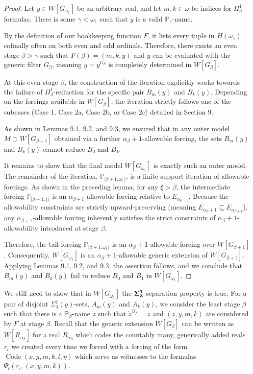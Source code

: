 \documentclass[a4paper,11pt]{article}
\newcommand{\forceP}{\mathbb{P}}
\begin{document}
\begin{proof}
Let $y \in W[G_{\omega_1}]$ be an arbitrary real, and let $m, k \in \omega$ be indices for $\Pi_3^1$ formulas. There is some $\gamma < \omega_1$ such that $\dot{y}$ is a valid $\mathbb{P}_\gamma$-name.

By the definition of our bookkeeping function $F$, it lists every tuple in $H(\omega_1)$ cofinally often on both even and odd ordinals. Therefore, there exists an even stage $\beta > \gamma$ such that $F(\beta) = (m, k, \dot{y})$ and  $\dot{y}$ can be evaluated with the generic filter $G_\beta$, meaning $y = \dot{y}^{G_\beta}$ is completely determined in $W[G_\beta]$.

At this even stage $\beta$, the construction of the iteration explicitly works towards the failure of $\Pi_3^1$-reduction for the specific pair $B_m(y)$ and $B_k(y)$. Depending on the forcings available in $W[G_\beta]$, the iteration strictly follows one of the subcases (Case 1, Case 2a, Case 2b, or Case 2c) detailed in Section 9. 


As shown in Lemmas 9.1, 9.2, and 9.3, we ensured that in any outer model $M \supset W[G_{\beta+1}]$ obtained via a further $\alpha_\beta+1$-allowable forcing, the sets $B_m(y)$ and $B_k(y)$ cannot reduce $B_0$ and $B_1$.

It remains to show that the final model $W[G_{\omega_1}]$ is exactly such an outer model. The remainder of the iteration, $\mathbb{P}_{[\beta+1, \omega_1)}$, is a finite support iteration of allowable forcings. As shown in the preceding lemma, for any $\xi > \beta$, the intermediate forcing $\mathbb{P}_{[\beta+1, \xi)}$ is an $\alpha_{\beta+1}$-allowable forcing relative to $E_{\alpha_{\beta+1}}$. Because the allowability constraints are strictly upward-preserving (meaning $E_{\alpha_\beta+1} \subseteq E_{\alpha_{\beta+1}}$), any $\alpha_{\beta+1}$-allowable forcing inherently satisfies the strict constraints of $\alpha_\beta+1$-allowability introduced at stage $\beta$. 

Therefore, the tail forcing $\mathbb{P}_{[\beta+1, \omega_1)}$ is an $\alpha_\beta+1$-allowable forcing over $W[G_{\beta+1}]$. Consequently, $W[G_{\omega_1}]$ is an $\alpha_\beta+1$-allowable generic extension of $W[G_{\beta+1}]$. Applying Lemmas 9.1, 9.2, and 9.3, the assertion follows, and we conclude that $B_m(y)$ and $B_k(y)$ fail to reduce $B_0$ and $B_1$ in $W[G_{\omega_1}]$.
\end{proof}


We still need to show that in $W[G_{\omega_1}]$ the $\bf{\Sigma}^1_3$-separation property is true. 
For a pair of disjoint $\Sigma^1_3(y)$-sets, $A_m(y)$ and $A_k(y)$,
we consider the least stage $\beta$ such that there is a $\forceP_{\beta}$-name $\dot{z}$ such that $\dot{z}^{G_{\beta}}=z$ and $(z,y,m,k)$ are considered by $F$ at stage $\beta$. Recall that the generic extension $W[G_{\beta}]$ can be written as $W[R_{\alpha_{\beta}}]$ for  a real $R_{\alpha_{\beta}}$ which codes the countably many, generically added reals $r_i$ we created every time we forced with a forcing of the form $\operatorname{Code} (x,y,m,k,l,\eta)$  which serve as witnesses to the formulas
$\Psi_l(r_i, (x,y,m,k))$.
\end{document}
